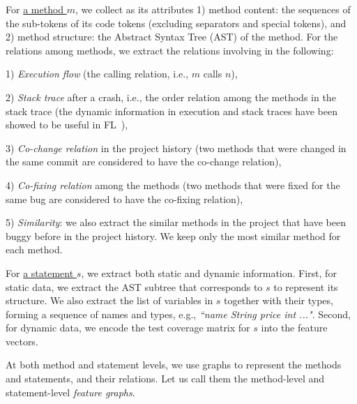 For \underline{a method $m$}, we collect as its attributes 1) method
content: the sequences of the sub-tokens of its code tokens (excluding
separators and special tokens), and 2) method structure: the Abstract
Syntax Tree (AST) of the method. For the relations among methods, we
extract the relations involving in the following:

1) {\em Execution flow} (the calling relation, i.e., $m$ calls $n$),

2) {\em Stack trace} after a crash, i.e., the order relation among the
methods in the stack trace (the dynamic information in execution
and stack traces have been showed to be useful in
FL~\cite{icse21-fl,DeepFL}),

3) {\em Co-change relation} in the project history (two methods that
were changed in the same commit are considered to have the co-change
relation),

4) {\em Co-fixing relation} among the methods (two methods that were
fixed for the same bug are considered to have the co-fixing relation),

5) {\em Similarity}: we also extract the similar methods in the
project that have been buggy before in the project history.
We keep only the most similar method for each method.


For \underline{a statement $s$}, we extract both static and dynamic
information. First, for static data, we extract the AST subtree that
corresponds to $s$ to represent its structure. We also extract the
list of variables in $s$ together with their types, forming a sequence
of names and types, e.g., {\em ``name String price int ..."}.  Second,
for dynamic data, we encode the test coverage matrix for $s$ into the
feature vectors.
%

At both method and statement levels, we use graphs to represent
the methods and statements, and their relations. Let us call
them the method-level and statement-level {\em feature graphs}.






